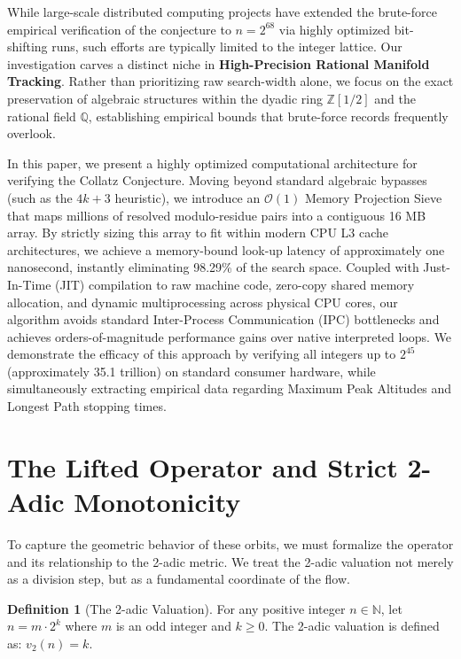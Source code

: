 \documentclass[11pt, a4paper]{article}
\theoremstyle{definition}
\newtheorem{definition}[theorem]{Definition}
\begin{document}
While large-scale distributed computing projects have extended the brute-force empirical verification of the conjecture to $n = 2^{68}$ via highly optimized bit-shifting runs, such efforts are typically limited to the integer lattice. Our investigation carves a distinct niche in \textbf{High-Precision Rational Manifold Tracking}. Rather than prioritizing raw search-width alone, we focus on the exact preservation of algebraic structures within the dyadic ring $\mathbb{Z}[1/2]$ and the rational field $\mathbb{Q}$, establishing empirical bounds that brute-force records frequently overlook.

In this paper, we present a highly optimized computational architecture for verifying the Collatz Conjecture. Moving beyond standard algebraic bypasses (such as the $4k+3$ heuristic), we introduce an $\mathcal{O}(1)$ Memory Projection Sieve that maps millions of resolved modulo-residue pairs into a contiguous 16 MB array. By strictly sizing this array to fit within modern CPU L3 cache architectures, we achieve a memory-bound look-up latency of approximately one nanosecond, instantly eliminating 98.29\% of the search space. Coupled with Just-In-Time (JIT) compilation to raw machine code, zero-copy shared memory allocation, and dynamic multiprocessing across physical CPU cores, our algorithm avoids standard Inter-Process Communication (IPC) bottlenecks and achieves orders-of-magnitude performance gains over native interpreted loops. We demonstrate the efficacy of this approach by verifying all integers up to $2^{45}$ (approximately 35.1 trillion) on standard consumer hardware, while simultaneously extracting empirical data regarding Maximum Peak Altitudes and Longest Path stopping times.

\section{The Lifted Operator and Strict 2-Adic Monotonicity}

To capture the geometric behavior of these orbits, we must formalize the operator and its relationship to the 2-adic metric. We treat the 2-adic valuation not merely as a division step, but as a fundamental coordinate of the flow.

\begin{definition}[The 2-adic Valuation]
For any positive integer $n\in\mathbb{N}$, let $n=m\cdot2^{k}$ where $m$ is an odd integer and $k\ge0$. The 2-adic valuation is defined as: $v_{2}(n)=k$.
\end{definition}
\end{document}
